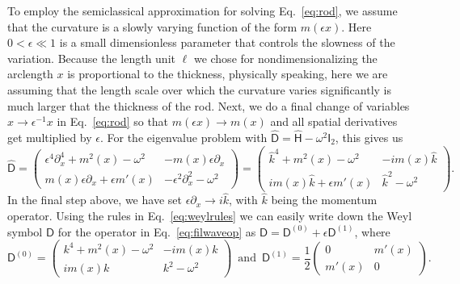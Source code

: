 To employ the semiclassical approximation for solving Eq.~\eqref{eq:rod}, we assume that the curvature is a slowly varying function of the form $m(\epsilon x)$.
Here $0 < \epsilon \ll 1$ is a small dimensionless parameter that controls the slowness of the variation.
Because the length unit $\ell$ we chose for nondimensionalizing the arclength $x$ is proportional to the thickness, physically speaking, here we are assuming that the length scale over which the curvature varies significantly is much larger that the thickness of the rod.
Next, we do a final change of variables $x \to \epsilon^{-1}x$ in Eq.~\eqref{eq:rod} so that $m(\epsilon x) \to m(x)$ and all spatial derivatives get multiplied by $\epsilon$.
For the eigenvalue problem with $\widehat{\mathsf{D}} = \widehat{\mathsf{H}} - \omega^{2}\mathsf{I}_{2}$, this gives us
%
\begin{equation}
 \widehat{\mathsf{D}} =
 \begin{pmatrix}
    \epsilon^{4}\partial^{4}_{x} + m^{2}(x) - \omega^{2} & -m(x)\epsilon\partial_{x}\\
    m(x)\epsilon\partial_{x} + \epsilon m'(x) & -\epsilon^{2}\partial^{2}_{x} - \omega^{2}
 \end{pmatrix}
=
 \begin{pmatrix}
   \hat{k}^{4} + m^{2}(x) -\omega^{2} & -i m(x)\hat{k}\\
    im(x)\hat{k} + \epsilon m'(x) & \hat{k}^{2} - \omega^{2}
\end{pmatrix}.
\label{eq:filwaveop}
\end{equation}
%
In the final step above, we have set $\epsilon\partial_{x} \to i\hat{k}$, with $\hat{k}$ being the momentum operator.
Using the rules in Eq.~\eqref{eq:weylrules} we can easily write down the Weyl symbol $\mathsf{D}$ for the operator in Eq.~\eqref{eq:filwaveop} as
$\mathsf{D} = \mathsf{D}^{(0)} + \epsilon\mathsf{D}^{(1)}$, where
%
\begin{equation}
\mathsf{D}^{(0)} =
 \begin{pmatrix}
    {k}^{4} + m^{2}(x) - \omega^{2} & -i m(x){k}\\
    im(x){k} & {k}^{2} - \omega^{2}
\end{pmatrix}
\enspace \text{and} \enspace
\mathsf{D}^{(1)} =
\frac{1}{2}
\begin{pmatrix}
    0 & m'(x)\\
    m'(x) & 0
\end{pmatrix}.
\label{eq:rod_D}
\end{equation}

